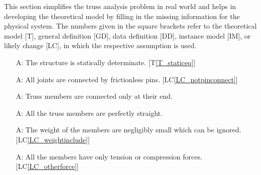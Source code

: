 \documentclass[12pt]{article}
\newcommand{\tref}[1]{T\ref{#1}}
\newcounter{assumpnum} %
\newcommand{\lcref}[1]{LC\ref{#1}}
\begin{document}
This section simplifies the truss analysis problem in real world and helps in 
developing the theoretical model by filling in the missing information for the 
physical system. The numbers given in the square brackets refer to the 
theoretical model [T], general definition [GD], data definition [DD], instance 
model [IM], or likely change [LC], in which the respective assumption is used.

\begin{itemize}
	
\item[A\refstepcounter{assumpnum}\theassumpnum \label{A_static}:]
 The structure is statically determinate. [\tref{T_staticeq}]
 
\end{itemize}

\begin{itemize}
	
	\item[A\refstepcounter{assumpnum}\theassumpnum \label{A_frictionless}:]
	All joints are connected by frictionless pins. [\lcref{LC_notpinconnect}]
	
\end{itemize}

\begin{itemize}
	
	\item[A\refstepcounter{assumpnum}\theassumpnum \label{A_connectatend}:]
	Truss members are connected only at their end. 
	
\end{itemize}

\begin{itemize}
	
	\item[A\refstepcounter{assumpnum}\theassumpnum \label{A_straight}:]
	All the truss members are perfectly straight. 
	
\end{itemize}

\begin{itemize}
	
	\item[A\refstepcounter{assumpnum}\theassumpnum \label{A_weightig}:]
	The weight of the members are negligibly small which can be ignored. 
	[\lcref{LC_weightinclude}]
	
\end{itemize}

\begin{itemize}
	
	\item[A\refstepcounter{assumpnum}\theassumpnum \label{A_twoforce}:]
	All the members have only tension or compression forces. 
	[\lcref{LC_otherforce}]
	
\end{itemize}
\end{document}
